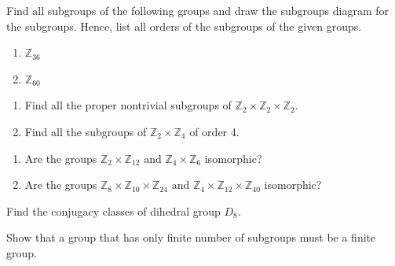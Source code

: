 \begin{mdframed}
    \vspace{0.752cm}
    \begin{Exercise}
        Find all subgroups of the following groups and draw the subgroups diagram for the subgroups. 
        Hence, list all orders of the subgroups of the given groups.
        \begin{enumerate}
            \item $\mathbb{Z}_{36}$
            \item $\mathbb{Z}_{60}$
        \end{enumerate} 
    \end{Exercise}

    \vspace{0.752cm}
    \begin{Exercise}
        \begin{enumerate}
            \item Find all the proper nontrivial subgroups of $\mathbb{Z}_2 \times \mathbb{Z}_2 \times \mathbb{Z}_2$.
            \item Find all the subgroups of $\mathbb{Z}_2 \times \mathbb{Z}_4$ of order 4. 
        \end{enumerate}
    \end{Exercise}

    \vspace{0.752cm}
    \begin{Exercise}
        \begin{enumerate}
            \item Are the groups $\mathbb{Z}_2 \times \mathbb{Z}_{12}$ and $\mathbb{Z}_4 \times \mathbb{Z}_{6}$ isomorphic?
            \item Are the groups $\mathbb{Z}_8 \times \mathbb{Z}_{10} \times \mathbb{Z}_{24}$ and $\mathbb{Z}_4 \times \mathbb{Z}_{12} \times \mathbb{Z}_{40}$ isomorphic?
        \end{enumerate}
    \end{Exercise}

    \vspace{0.752cm}
    \begin{Exercise}
        Find the conjugacy classes of dihedral group $D_8$. 
    \end{Exercise}

    \vspace{0.752cm}
    \begin{Exercise}
        Show that a group that has only finite number of subgroups must be a finite group.
    \end{Exercise}


\end{mdframed}
